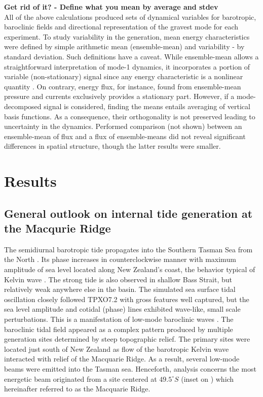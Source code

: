 \documentclass[12pt]{article}
\begin{document}
\textbf{Get rid of it? - Define what you mean by average and stdev}\\
All of the above calculations produced sets of dynamical variables for barotropic, baroclinic 
fields and directional representation of the gravest mode for each experiment. To study 
variability in the generation, mean energy characteristics were defined by simple arithmetic mean 
(ensemble-mean) and variability - by standard deviation. Such definitions have a caveat. 
While ensemble-mean allows a straightforward interpretation of mode-1 dynamics, it 
incorporates  
a portion of variable (non-stationary) signal since any energy characteristic is a nonlinear 
quantity \citep{zaron2014time}. On contrary, energy flux, for instance, found from ensemble-mean 
pressure and currents exclusively provides a stationary part. However, if a mode-decomposed signal 
is considered, finding the means entails averaging of vertical basis functions. As a 
consequence, their orthogonality is not preserved leading to uncertainty in the dynamics. 
Performed comparison (not shown) between an ensemble-mean of flux and a flux of ensemble-means did 
not reveal significant differences in spatial structure, though the latter results were smaller.

\section{Results}
\subsection{General outlook on internal tide generation at the Macqurie Ridge}
\label{C3.sec:main_res}
The semidiurnal barotropic tide propagates into the Southern Tasman Sea from the North 
. Its phase increases in counterclockwise manner with maximum amplitude of sea 
level located along New Zealand's coast, the behavior typical of Kelvin wave 
\citep{walters2001ocean}. 
The strong tide is also observed in shallow Bass Strait, but relatively weak anywhere 
else in the basin. The simulated sea surface tidal oscillation closely followed TPXO7.2 with gross 
features well captured, but the sea level amplitude and cotidal (phase) lines exhibited wave-like, 
small scale perturbations. This is a manifestation of low-mode baroclinic waves 
. The baroclinic tidal field appeared as a complex pattern produced by 
multiple generation sites determined by steep topographic relief. The primary sites were located  
just south of New Zealand as flow of the barotropic Kelvin wave interacted with relief of the 
Macquarie Ridge. As a result, several low-mode beams were emitted into the Tasman 
sea. Henceforth, analysis concerns the most energetic beam originated from a site centered at 
$49.5^{\circ}S$ (inset on ) which hereinafter referred to as the Macquarie 
Ridge.\\
\end{document}
